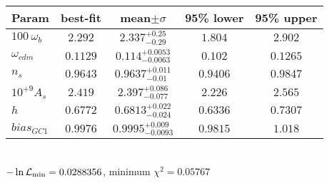 \begin{tabular}{|l|c|c|c|c|} 
 \hline 
Param & best-fit & mean$\pm\sigma$ & 95\% lower & 95\% upper \\ \hline 
$100~\omega_{b }$ &$2.292$ & $2.337_{-0.29}^{+0.25}$ & $1.804$ & $2.902$ \\ 
$\omega_{cdm }$ &$0.1129$ & $0.114_{-0.0063}^{+0.0053}$ & $0.102$ & $0.1265$ \\ 
$n_{s }$ &$0.9643$ & $0.9637_{-0.01}^{+0.011}$ & $0.9406$ & $0.9847$ \\ 
$10^{+9}A_{s }$ &$2.419$ & $2.397_{-0.077}^{+0.086}$ & $2.226$ & $2.565$ \\ 
$h$ &$0.6772$ & $0.6813_{-0.024}^{+0.022}$ & $0.6336$ & $0.7307$ \\ 
$bias_{GC 1 }$ &$0.9976$ & $0.9995_{-0.0093}^{+0.009}$ & $0.9815$ & $1.018$ \\ 
\hline 
 \end{tabular} \\ 
$-\ln{\cal L}_\mathrm{min} =0.0288356$, minimum $\chi^2=0.05767$ \\ 
